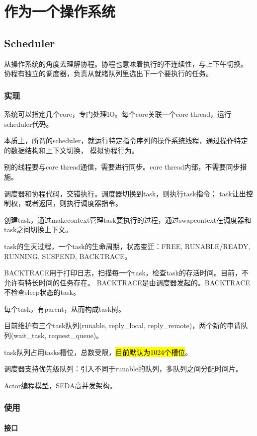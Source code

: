 \chapter{作为一个操作系统}

\section{Scheduler}

从操作系统的角度去理解协程。协程也意味着执行的不连续性，与上下午切换。
协程有独立的调度器，负责从就绪队列里选出下一个要执行的任务。

\subsection{实现}

系统可以指定几个core，专门处理IO。每个core关联一个core thread，运行scheduler代码。

本质上，所谓的scheduler，就运行特定指令序列的操作系统线程，通过操作特定的数据结构和上下文切换，
模拟协程行为。

别的线程要与core thread通信，需要进行同步。core thread内部，不需要同步措施。

调度器和协程代码，交错执行。调度器切换到task，则执行task指令；
task让出控制权，或者返回，则执行调度器指令。

创建task，通过makecontext管理task要执行的过程，通过swapcontext在调度器和task之间切换上下文。

task的生灭过程，一个task的生命周期，状态变迁：FREE, RUNABLE/READY, RUNNING, SUSPEND, BACKTRACE。

BACKTRACE用于打印日志，扫描每一个task，检查task的存活时间。目前，不允许有特长时间的任务存在。
BACKTRACE是由调度器发起的。BACKTRACE不检查sleep状态的task。

每个task，有parent，从而构成task树。

目前维护有三个task队列(runable, reply\_local, reply\_remote)，两个新的申请队列(wait\_task, request\_queue)。

task队列占用tasks槽位，总数受限，\hl{目前默认为1024个槽位}。

调度器支持优先级队列：引入不同于runable的队列，多队列之间分配时间片。

Actor编程模型，SEDA高并发架构。

\subsection{使用}

\subsubsection{接口}

